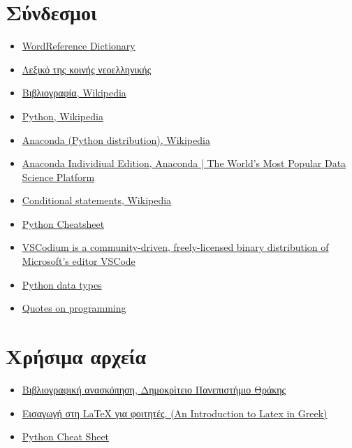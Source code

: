 \documentclass[12pt]{extreport}
\begin{document}
\section{Σύνδεσμοι}
\begin{itemize}
    \item \href{https://tinyurl.com/yyzfa2bg}{WordReference Dictionary}
    \item \href{https://tinyurl.com/o5vxal7}{Λεξικό της κοινής νεοελληνικής}
    \item \href{https://tinyurl.com/y9q2elk4}{Βιβλιογραφία, Wikipedia}
    \item \href{https://tinyurl.com/y9g9nkh2}{Python, Wikipedia}
    \item \href{https://tinyurl.com/ycy6jsw5}{Anaconda (Python distribution),
              Wikipedia}
    \item \href{https://tinyurl.com/y7rogsec}{Anaconda Individiual Edition,
              Anaconda | The World's Most Popular Data Science Platform}
    \item \href{https://tinyurl.com/ogoqf2p}{Conditional statements, Wikipedia}
    \item \href{https://tinyurl.com/y8y59y44}{Python Cheatsheet}
    \item \href{https://tinyurl.com/y54gclet}{VSCodium is a community-driven,
              freely-licensed binary distribution of Microsoft’s editor VSCode}
    \item \href{https://www.tutorialsteacher.com/python/python-data-types}{Python data types}
    \item \href{https://www.goodreads.com/quotes/tag/programming}{Quotes on programming}
\end{itemize}
\section{Χρήσιμα αρχεία}
\begin{itemize}
    \item \href{https://tinyurl.com/y9l8o5n6}{Βιβλιογραφική ανασκόπηση,
              Δημοκρίτειο Πανεπιστήμιο Θράκης}
    \item \href{https://tinyurl.com/yaaswz5p}{Εισαγωγή στη LaTeX για φοιτητές.
              (An Introduction to Latex in Greek)}
    \item \href{https://tinyurl.com/nqbrvss}{Python Cheat Sheet}
\end{itemize}
\end{document}

